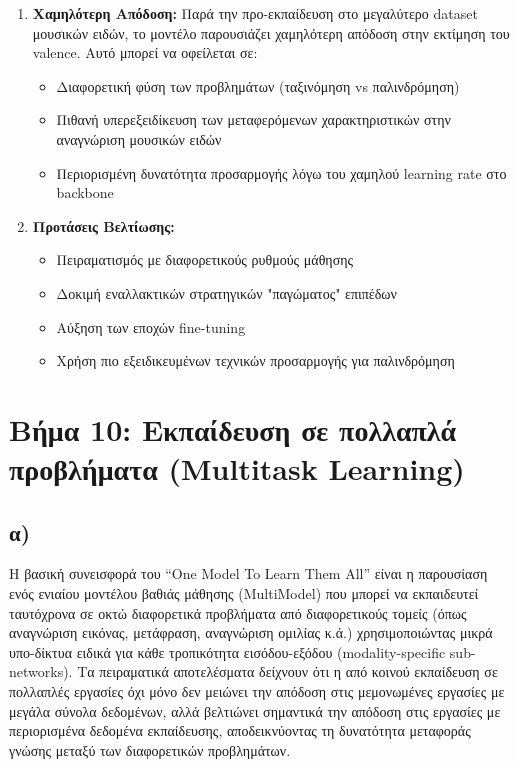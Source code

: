 \documentclass[a4paper,12pt]{article}
\begin{document}
\begin{enumerate}
    \item \textbf{Χαμηλότερη Απόδοση:} Παρά την προ-εκπαίδευση στο μεγαλύτερο dataset μουσικών ειδών, το μοντέλο παρουσιάζει χαμηλότερη απόδοση στην εκτίμηση του valence. Αυτό μπορεί να οφείλεται σε:
    \begin{itemize}
        \item Διαφορετική φύση των προβλημάτων (ταξινόμηση vs παλινδρόμηση)
        \item Πιθανή υπερεξειδίκευση των μεταφερόμενων χαρακτηριστικών στην αναγνώριση μουσικών ειδών
        \item Περιορισμένη δυνατότητα προσαρμογής λόγω του χαμηλού learning rate στο backbone
    \end{itemize}

    \item \textbf{Προτάσεις Βελτίωσης:}
    \begin{itemize}
        \item Πειραματισμός με διαφορετικούς ρυθμούς μάθησης
        \item Δοκιμή εναλλακτικών στρατηγικών "παγώματος" επιπέδων
        \item Αύξηση των εποχών fine-tuning
        \item Χρήση πιο εξειδικευμένων τεχνικών προσαρμογής για παλινδρόμηση
    \end{itemize}
\end{enumerate}


\section*{Βήμα 10: Εκπαίδευση σε πολλαπλά προβλήματα (Multitask Learning)}

\subsection*{α)}

Η βασική συνεισφορά του ``One Model To Learn Them All'' είναι η παρουσίαση ενός ενιαίου μοντέλου βαθιάς μάθησης
(MultiModel) που μπορεί να εκπαιδευτεί ταυτόχρονα σε οκτώ διαφορετικά προβλήματα από διαφορετικούς τομείς
(όπως αναγνώριση εικόνας, μετάφραση, αναγνώριση ομιλίας κ.ά.) χρησιμοποιώντας μικρά υπο-δίκτυα ειδικά για κάθε τροπικότητα εισόδου-εξόδου
(modality-specific sub-networks). Τα πειραματικά αποτελέσματα δείχνουν ότι η από κοινού εκπαίδευση σε πολλαπλές εργασίες
όχι μόνο δεν μειώνει την απόδοση στις μεμονωμένες εργασίες με μεγάλα σύνολα δεδομένων, αλλά βελτιώνει σημαντικά την
απόδοση στις εργασίες με περιορισμένα δεδομένα εκπαίδευσης, αποδεικνύοντας τη δυνατότητα μεταφοράς γνώσης μεταξύ των διαφορετικών προβλημάτων.
\end{document}

